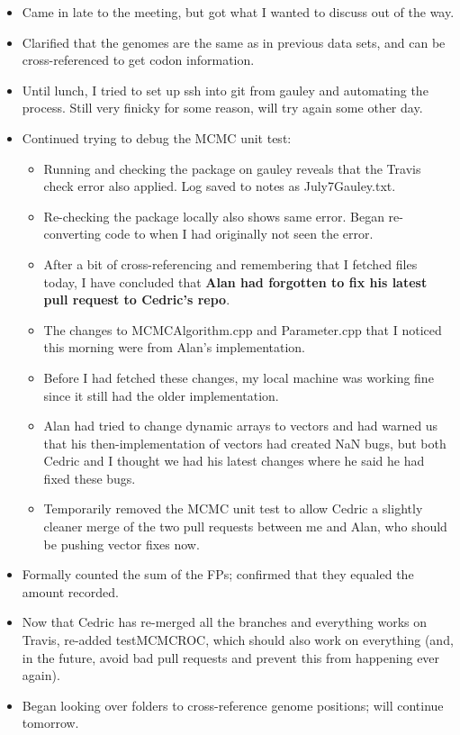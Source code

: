 \documentclass[12pt,hyperref]{labbook}
\begin{document}
\begin{itemize}
    \item Came in late to the meeting, but got what I wanted to discuss out of the way.
    \item Clarified that the genomes are the same as in previous data sets, and can be cross-referenced to get codon information.
    \item Until lunch, I tried to set up ssh into git from gauley and automating the process. Still very finicky for some reason, will try again some other day.
    \item Continued trying to debug the MCMC unit test:
    \begin{itemize}
        \item Running and checking the package on gauley reveals that the Travis check error also applied. Log saved to notes as July7Gauley.txt.
        \item Re-checking the package locally also shows same error.
        Began re-converting code to when I had originally not seen the error.
        \item After a bit of cross-referencing and remembering that I fetched files today, I have concluded that \textbf{Alan had forgotten to fix his latest pull request to Cedric's repo}. 
        \item The changes to MCMCAlgorithm.cpp and Parameter.cpp that I noticed this morning were from Alan's implementation.
        \item Before I had fetched these changes, my local machine was working fine since it still had the older implementation.
        \item Alan had tried to change dynamic arrays to vectors and had warned us that his then-implementation of vectors had created NaN bugs, but both Cedric and I thought we had his latest changes where he said he had fixed these bugs.
        \item Temporarily removed the MCMC unit test to allow Cedric a slightly cleaner merge of the two pull requests between me and Alan, who should be pushing vector fixes now.
    \end{itemize}
    \item Formally counted the sum of the FPs; confirmed that they equaled the amount recorded.
    \item Now that Cedric has re-merged all the branches and everything works on Travis, re-added testMCMCROC, which should also work on everything (and, in the future, avoid bad pull requests and prevent this from happening ever again).
    \item Began looking over folders to cross-reference genome positions; will continue tomorrow.
\end{itemize}
\end{document}
